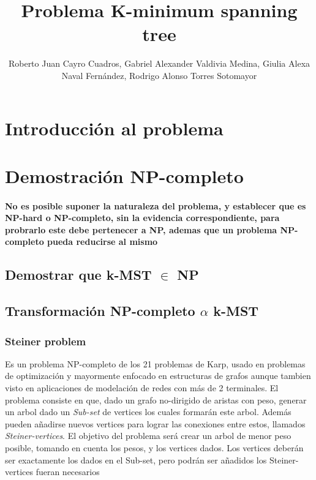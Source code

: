 \documentclass[preprint,12pt]{elsarticle}
\begin{document}
\begin{frontmatter}
\title{Problema K-minimum spanning tree}
\author{Roberto Juan Cayro Cuadros, Gabriel Alexander Valdivia Medina,
Giulia Alexa Naval Fernández, Rodrigo Alonso Torres Sotomayor}

\address{Universidad Católica San Pablo}

\begin{abstract}
\end{abstract}

\begin{keyword}
\end{keyword}

\end{frontmatter}


\section{Introducción al problema}



\section{Demostración NP-completo}
\paragraph{\textnormal{No es posible suponer la naturaleza del problema, y establecer que es NP-hard o NP-completo, sin la evidencia correspondiente, para probrarlo este debe pertenecer a NP, ademas que un problema NP-completo pueda reducirse al mismo}}
\subsection{Demostrar que k-MST $\in$ NP}


\subsection{Transformación NP-completo $\alpha$  k-MST}
\subsubsection{Steiner problem}
\textnormal{Es un problema NP-completo de los 21 problemas de Karp, usado en problemas de optimización y mayormente enfocado en estructuras de grafos aunque tambien visto en aplicaciones de modelación de redes con más de 2 terminales. El problema consiste en que,  dado un grafo no-dirigido de aristas con peso, generar un arbol dado un
\textit{Sub-set} de vertices los cuales formarán este arbol. Además pueden añadirse nuevos vertices para lograr las conexiones entre estos, llamados \textit{Steiner-vertices}. El objetivo del problema será crear un arbol de menor peso posible, tomando en cuenta los pesos, y los vertices dados. Los vertices deberán ser exactamente los dados en el Sub-set, pero podrán ser añadidos los Steiner-vertices fueran necesarios}
\end{document}
